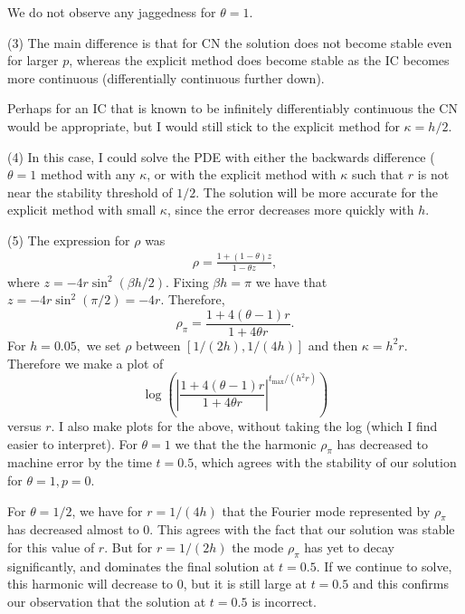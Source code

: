 \documentclass[11pt]{article}
\def\f{\frac }
\begin{document}
\begin{enumerate}
We do not observe any jaggedness for $\theta = 1$.

(3) The main difference is that for CN the solution does not become stable even for larger $p$, whereas the explicit method does become stable as the IC becomes more continuous (differentially continuous further down).

Perhaps for an IC that is known to be infinitely differentiably continuous the CN would be appropriate, but I would still stick to the explicit method for $\kappa = h/2$.

(4) In this case, I could solve the PDE with either the backwards difference ($\theta  = 1$ method with any $\kappa$, or with the explicit method with $\kappa$ such that $r$ is not near the stability threshold of $1/2$.
The solution will be more accurate for the explicit method with small $\kappa$, since the error decreases more quickly with $h$.

(5) The expression for $\rho$ was 
\begin{align*} \rho  =  \f{ 1+ (1-\theta) z} {1-\theta z}, \end{align*}
where $z = -4r \sin ^2 \left ( \beta h / 2 \right ) $.
Fixing $\beta h = \pi$ we have that $z = -4r \sin ^2 \left ( \pi / 2 \right )  = -4r $.
Therefore, 
\[ \rho _\pi = \f{1+ 4(\theta-1)r}{1+4\theta r} . \]
For $h = 0.05,$ we set $\rho$ between $[1/(2h),1/(4h)]$ and then $\kappa = h^2 r$.
Therefore we make a plot of
\[ \log \left ( \left | \f{1+ 4(\theta-1)r}{1+4\theta r} \right | ^{t_{\max} / (h^2 r) } \right ) \]
versus $r$.
I also make plots for the above, without taking the log (which I find easier to interpret).
For $\theta = 1$ we that the the harmonic $\rho _\pi$ has decreased to machine error by the time $t = 0.5$, which agrees with the stability of our solution for $\theta =1, p = 0$.

For $\theta = 1/2$, we have for $r = 1/(4h)$ that the Fourier mode represented by $\rho _\pi$ has decreased almost to 0.
This agrees with the fact that our solution was stable for this value of $r$.
But for $r = 1/(2h)$ the mode $\rho _\pi$ has yet to decay significantly, and dominates the final solution at $t = 0.5$.
If we continue to solve, this harmonic will decrease to 0, but it is still large at $t = 0.5$ and this confirms our observation that the solution at $t = 0.5$ is incorrect.


\end{enumerate}
\end{document}
